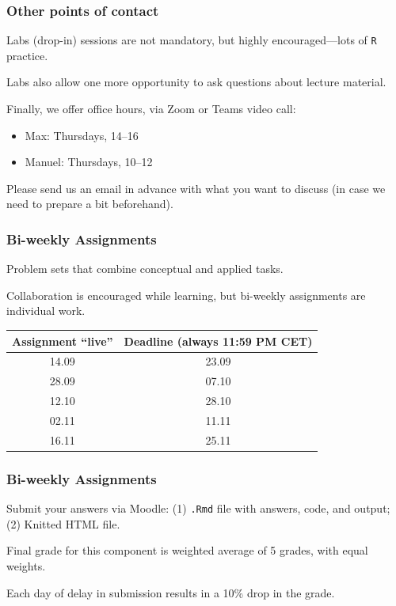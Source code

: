 \documentclass[12pt,english,dvipsnames,aspectratio=169, handout]{beamer}
\begin{document}
\begin{frame}
	\frametitle{Other points of contact}
	Labs (drop-in) sessions are not mandatory, but highly encouraged---lots of \texttt{R} practice.\bigskip
	
	Labs also allow one more opportunity to ask questions about lecture material.\bigskip
	
	Finally, we offer office hours, via Zoom or Teams video call:
	
	\begin{itemize}
		\item Max: Thursdays, 14--16
		\item Manuel: Thursdays, 10--12
	\end{itemize}
	
	Please send us an email in advance with what you want to discuss (in case we need to prepare a bit beforehand).
	
\end{frame}


\begin{frame}
	\frametitle{Bi-weekly Assignments}
	Problem sets that combine conceptual and applied tasks.\bigskip
	
	Collaboration is encouraged while learning, but bi-weekly assignments are individual work.\bigskip
	
	\begin{table}
	\scriptsize
	\begin{tabular}{c c}
		\toprule
		\textbf{Assignment ``live''} & \textbf{Deadline} (always 11:59 PM CET) \\
		\midrule
		14.09 & 23.09 \\
		28.09 & 07.10 \\
		12.10 & 28.10 \\
		02.11 & 11.11 \\
		16.11 & 25.11 \\
		\bottomrule
	\end{tabular}
	\end{table}

\end{frame}


\begin{frame}
	\frametitle{Bi-weekly Assignments}
	Submit your answers via Moodle: (1) \texttt{.Rmd} file with answers, code, and output; (2) Knitted HTML file.\bigskip
	
	Final grade for this component is weighted average of 5 grades, with equal weights.\bigskip
	
	Each day of delay in submission results in a 10\% drop in the grade.
\end{frame}
\end{document}
